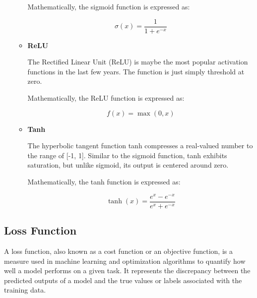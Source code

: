 \begin{itemize}
\begin{itemize}
\raggedright
Mathematically, the sigmoid function is expressed as:

\[ \sigma(x) = \frac{1}{1 + e^{-x}} \]

\item \textbf{ReLU}

The Rectified Linear Unit (ReLU) is maybe the most popular activation functions in the last few years. The function is just simply threshold at zero.

\centering
{}

\raggedright
Mathematically, the ReLU function is expressed as:

\[f(x) = \max(0, x)\]

\item \textbf{Tanh}

The hyperbolic tangent function tanh compresses a real-valued number to the range of [-1, 1]. Similar to the sigmoid function, tanh exhibits saturation, but unlike sigmoid, its output is centered around zero.

\centering
{}

\raggedright
Mathematically, the tanh function is expressed as:

\[ \tanh(x) = \frac{{e^x - e^{-x}}}{{e^x + e^{-x}}} \]

\end{itemize}

\end{itemize}
\subsection{Loss Function}

A loss function, also known as a cost function or an objective function, is a measure used in machine learning and optimization algorithms to quantify how well a model performs on a given task. It represents the discrepancy between the predicted outputs of a model and the true values or labels associated with the training data. \\

